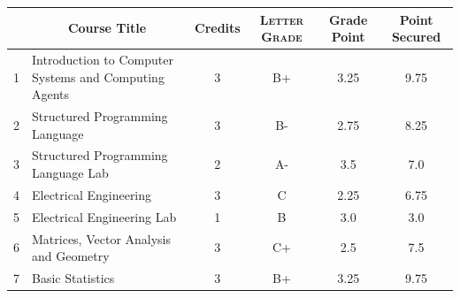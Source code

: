 \documentclass[11pt]{article}
\newcommand*{\numtwo}[1]{\pgfmathprintnumber[
                    fixed, precision=2, fixed zerofill=true]{#1}}
\begin{document}
                \begin{center}
                    \renewcommand{\arraystretch}{1.08}
                    
                \begin{tabular}{|c|l|c|>{\scshape}c|c|c|}
                \hline  \rule[-1ex]{0pt}{3.5ex} {\centering{\bf Course Code}} &  \multicolumn{1}{c|}{\textbf{Course Title}}  & {\bf Credits} & {\bf Letter Grade} & {\bf Grade Point} & {\bf Point Secured}  \\ 
                \hline   1 &  Introduction to Computer Systems and Computing Agents		 & 3 & B+ & 3.25 & 9.75 \\ %
                \hline   2 &  Structured Programming Language		 & 3 & B- & 2.75 & 8.25 \\ %
                \hline   3 &  Structured Programming Language Lab		 & 2 & A- & 3.5 & 7.0 \\ %
                \hline   4 &  Electrical Engineering		 & 3 & C & 2.25 & 6.75 \\ %
                \hline   5 &  Electrical Engineering Lab		 & 1 & B & 3.0 & 3.0 \\ %
                \hline   6 &  Matrices, Vector Analysis and Geometry		 & 3 & C+ & 2.5 & 7.5 \\ %
                \hline   7 &  Basic Statistics		 & 3 & B+ & 3.25 & 9.75 \\ %

\hline                %
                \end{tabular}
                \end{center}
                \renewcommand{\arraystretch}{1.03}
\end{document}
